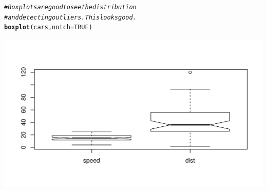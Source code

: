 \documentclass[draft]{article}\usepackage[]{graphicx}\usepackage[]{color}
\makeatletter
\def\maxwidth{ %
  \ifdim\Gin@nat@width>\linewidth
    \linewidth
  \else
    \Gin@nat@width
  \fi
}
\newcommand{\hlnum}[1]{\textcolor[rgb]{0.686,0.059,0.569}{#1}}%
\newcommand{\hlcom}[1]{\textcolor[rgb]{0.678,0.584,0.686}{\textit{#1}}}%
\newcommand{\hlstd}[1]{\textcolor[rgb]{0.345,0.345,0.345}{#1}}%
\newcommand{\hlkwc}[1]{\textcolor[rgb]{0.333,0.667,0.333}{#1}}%
\newcommand{\hlkwd}[1]{\textcolor[rgb]{0.737,0.353,0.396}{\textbf{#1}}}%
\newenvironment{kframe}{%
 \def\at@end@of@kframe{}%
 \ifinner\ifhmode%
  \def\at@end@of@kframe{\end{minipage}}%
  \begin{minipage}{\columnwidth}%
 \fi\fi%
 \def\FrameCommand##1{\hskip\@totalleftmargin \hskip-\fboxsep
 \colorbox{shadecolor}{##1}\hskip-\fboxsep
     \hskip-\linewidth \hskip-\@totalleftmargin \hskip\columnwidth}%
 \MakeFramed {\advance\hsize-\width
   \@totalleftmargin\z@ \linewidth\hsize
   \@setminipage}}%
 {\par\unskip\endMakeFramed%
 \at@end@of@kframe}
\newenvironment{knitrout}{}{} %
\makeatother
\begin{document}
\begin{knitrout}
\color{fgcolor}\begin{kframe}
\begin{alltt}
    \hlcom{# Boxplots are good to see the distribution}
    \hlcom{# and detecting outliers. This looks good.}
    \hlkwd{boxplot}\hlstd{(cars,} \hlkwc{notch}\hlstd{=}\hlnum{TRUE}\hlstd{)}
\end{alltt}
\end{kframe}
\includegraphics[width=\maxwidth]{figure/cars-boxplot-1} 

\end{knitrout}
  
\end{document}
